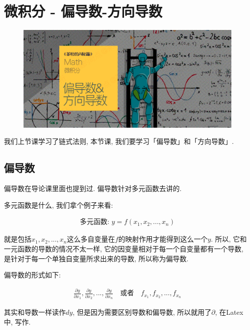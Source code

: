 \chapter{微积分 - 偏导数-方向导数}

\begin{figure}[ht]
  \centering
  \includegraphics[width=1\textwidth]{asset/20230831112453.png}
\end{figure}

\newpage

我们上节课学习了链式法则, 本节课, 我们要学习「偏导数」和「方向导数」. 

\section{偏导数}

偏导数在导论课里面也提到过. 偏导数针对多元函数去讲的. 

多元函数是什么, 我们拿个例子来看: 

\begin{align*}
  \mbox{多元函数: }y = f(x_1, x_2, ..., x_n)
\end{align*}

就是包括$x_1,  x_2,  ...,  x_n$这么多自变量在$f$的映射作用才能得到这么一个$y$. 所以, 它和一元函数的导数的情况不太一样, 它的因变量相对于每一个自变量都有一个导数, 是针对于每一个单独自变量所求出来的导数, 所以称为偏导数. 

偏导数的形式如下: 

\begin{align*}
  \frac{\partial y}{\partial x_1},  \frac{\partial y}{\partial x_2},  ...,  \frac{\partial y}{\partial x_n} \quad \mbox{或者} \quad f_{x_1},  f_{x_2},  ...,  f_{x_n}
\end{align*}

其实和导数一样读作\(dy\),  但是因为需要区别导数和偏导数, 所以就用了\(\partial\), 在Latex中, 写作\pyth{\partial}.

